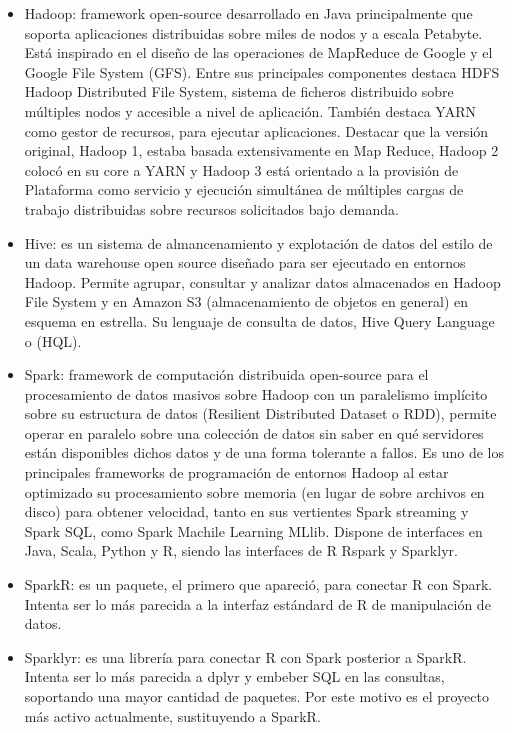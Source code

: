 \documentclass[
]{book}
\begin{document}
\begin{itemize}
\item
  Hadoop: framework open-source desarrollado en Java principalmente que soporta aplicaciones distribuidas sobre miles de nodos y a escala Petabyte. Está inspirado en el diseño de las operaciones de MapReduce de Google y el Google File System (GFS). Entre sus principales componentes destaca HDFS Hadoop Distributed File System, sistema de ficheros distribuido sobre múltiples nodos y accesible a nivel de aplicación. También destaca YARN como gestor de recursos, para ejecutar aplicaciones. Destacar que la versión original, Hadoop 1, estaba basada extensivamente en Map Reduce, Hadoop 2 colocó en su core a YARN y Hadoop 3 está orientado a la provisión de Plataforma como servicio y ejecución simultánea de múltiples cargas de trabajo distribuidas sobre recursos solicitados bajo demanda.
\item
  Hive: es un sistema de almancenamiento y explotación de datos del estilo de un data warehouse open source diseñado para ser ejecutado en entornos Hadoop. Permite agrupar, consultar y analizar datos almacenados en Hadoop File System y en Amazon S3 (almacenamiento de objetos en general) en esquema en estrella. Su lenguaje de consulta de datos, Hive Query Language o (HQL).
\item
  Spark: framework de computación distribuida open-source para el procesamiento de datos masivos sobre Hadoop con un paralelismo implícito sobre su estructura de datos (Resilient Distributed Dataset o RDD), permite operar en paralelo sobre una colección de datos sin saber en qué servidores están disponibles dichos datos y de una forma tolerante a fallos. Es uno de los principales frameworks de programación de entornos Hadoop al estar optimizado su procesamiento sobre memoria (en lugar de sobre archivos en disco) para obtener velocidad, tanto en sus vertientes Spark streaming y Spark SQL, como Spark Machile Learning MLlib. Dispone de interfaces en Java, Scala, Python y R, siendo las interfaces de R Rspark y Sparklyr.
\item
  SparkR: es un paquete, el primero que apareció, para conectar R con Spark. Intenta ser lo más parecida a la interfaz estándard de R de manipulación de datos.
\item
  Sparklyr: es una librería para conectar R con Spark posterior a SparkR. Intenta ser lo más parecida a dplyr y embeber SQL en las consultas, soportando una mayor cantidad de paquetes. Por este motivo es el proyecto más activo actualmente, sustituyendo a SparkR.
\end{itemize}
\end{document}
